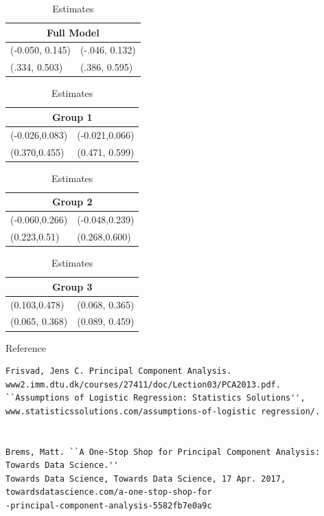 \documentclass[12pt]{article}
\begin{document}
\begin{table}[H]
\begin{tabular}{ |p{3cm}|p{3cm}|  }
\hline
\multicolumn{2}{|c|}{Full Model} \\
\hline
(-0.050, 0.145) & (-.046, 0.132) \\
\hline
(.334, 0.503) &  (.386, 0.595) \\
\hline
\end{tabular}
\quad
\begin{tabular}{ |p{3cm}|p{3cm}|  }
\hline
\multicolumn{2}{|c|}{Group 1} \\
\hline
(-0.026,0.083) & (-0.021,0.066) \\
\hline
(0.370,0.455) &  (0.471, 0.599) \\
\hline
\end{tabular}
\quad
\begin{tabular}{ |p{3cm}|p{3cm}|  }
\hline
\multicolumn{2}{|c|}{Group 2} \\
\hline
(-0.060,0.266) & (-0.048,0.239) \\
\hline
(0.223,0.51) &  (0.268,0.600) \\
\hline
\end{tabular}
\quad
\begin{tabular}{ |p{3cm}|p{3cm}|  }
\hline
\multicolumn{2}{|c|}{Group 3} \\
\hline
(0.103,0.478) & (0.068, 0.365) \\
\hline
(0.065, 0.368) & (0.089, 0.459)\\
\hline

\end{tabular}
\caption{Estimates}
\end{table}

\newpage


Reference
\begin{verbatim} 
Frisvad, Jens C. Principal Component Analysis. 
www2.imm.dtu.dk/courses/27411/doc/Lection03/PCA2013.pdf.
``Assumptions of Logistic Regression: Statistics Solutions'', 
www.statisticssolutions.com/assumptions-of-logistic regression/.


Brems, Matt. ``A One-Stop Shop for Principal Component Analysis: 
Towards Data Science.'' 
Towards Data Science, Towards Data Science, 17 Apr. 2017, 
towardsdatascience.com/a-one-stop-shop-for
-principal-component-analysis-5582fb7e0a9c
\end{verbatim} 
\end{document}
